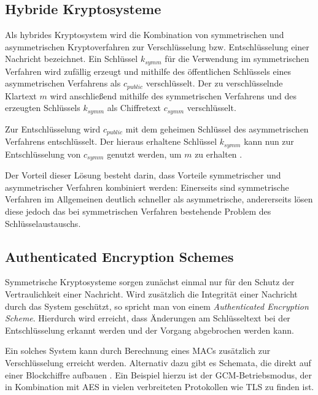 \subsection{Hybride Kryptosysteme}

\label{sec_basics_hybrid}

Als hybrides Kryptosystem wird die Kombination von symmetrischen und asymmetrischen Kryptoverfahren zur Verschlüsselung bzw. Entschlüsselung einer Nachricht bezeichnet. Ein Schlüssel \(k_{symm}\) für die Verwendung im symmetrischen Verfahren wird zufällig erzeugt und mithilfe des öffentlichen Schlüssels eines asymmetrischen Verfahrens als \(c_{public}\) verschlüsselt. Der zu verschlüsselnde Klartext \(m\) wird anschließend mithilfe des symmetrischen Verfahrens und des erzeugten Schlüssels \(k_{symm}\) als Chiffretext \(c_{symm}\) verschlüsselt. 

Zur Entschlüsselung wird \(c_{public}\) mit dem geheimen Schlüssel des asymmetrischen Verfahrens entschlüsselt. Der hieraus erhaltene Schlüssel \(k_{symm}\) kann nun zur Entschlüsselung von \(c_{symm}\) genutzt werden, um \(m\) zu erhalten \cite{katz2014}.

Der Vorteil dieser Lösung besteht darin, dass Vorteile symmetrischer und asymmetrischer Verfahren kombiniert werden: Einerseits sind symmetrische Verfahren im Allgemeinen deutlich schneller als asymmetrische, andererseits lösen diese jedoch das bei symmetrischen Verfahren bestehende Problem des Schlüs\-sel\-aus\-tauschs.

\subsection{Authenticated Encryption Schemes}

\label{sec_basics_ae}

Symmetrische Kryptosysteme sorgen zunächst einmal nur für den Schutz der Vertraulichkeit einer Nachricht. Wird zusätzlich die Integrität einer Nachricht durch das System geschützt, so spricht man von einem \textit{Authenticated Encryption Scheme}. Hierdurch wird erreicht, dass Änderungen am Schlüsseltext bei der Entschlüsselung erkannt werden und der Vorgang abgebrochen werden kann.

Ein solches System kann durch Berechnung eines MACs zusätzlich zur Verschlüsselung erreicht werden. Alternativ dazu gibt es Schemata, die direkt auf einer Blockchiffre aufbauen \cite{boneh2016}. Ein Beispiel hierzu ist der GCM-Betriebsmodus, der in Kombination mit AES in vielen verbreiteten Protokollen wie TLS zu finden ist.


